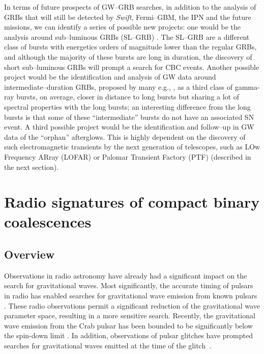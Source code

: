 In terms of future prospects of GW--GRB searches, in addition to the analysis of GRBs that will still be detected by \emph{Swift}, Fermi--GBM, the IPN and the future missions, we can identify a series of possible new projects: one would be the analysis around sub--luminous GRBs (SL--GRB) \cite{Howell:2010hm}. The SL--GRB are a different class of bursts with energetics orders of magnitude lower than the regular GRBs, and although the majority of these bursts are long in duration, the discovery of short sub--luminous GRBs will prompt a search for \ac{CBC} events. Another possible project would be the identification and analysis of GW data around intermediate--duration GRBs, proposed by many e.g., \cite{Postigo:2010ij}, as a third class of gamma-ray bursts, on average, closer in distance to long bursts but sharing a lot of spectral properties with the long bursts; an interesting difference from the long bursts is that some of these ``intermediate'' bursts do not have an associated SN event. A third possible project would be the identification and follow--up in GW data of the ``orphan'' afterglows. This is highly dependent on the discovery of such electromagnetic transients by the next generation of telescopes, such as LOw Frequency ARray (LOFAR) or Palomar Transient Factory (PTF) (described in the next section).


\section{Radio signatures of compact binary coalescences}
\label{section:radio}
\subsection{Overview}
Observations in radio astronomy have already had a significant impact on
the search for gravitational waves.  Most significantly, the accurate
timing of pulsars in radio has enabled searches for gravitational wave
emission from known pulsars \cite{Kim:2006fm}.  These radio
observations permit a significant reduction of the gravitational wave
parameter space, resulting in a more sensitive search.
Recently, the gravitational wave emission from the Crab pulsar has been
bounded to be significantly below the spin-down limit \cite{crab}.  In
addition, observations of pulsar glitches \cite{Flanagan:2006,Buchner:2008} have prompted
searches for gravitational waves emitted at the time of the glitch~\cite{Clark:2007}.

